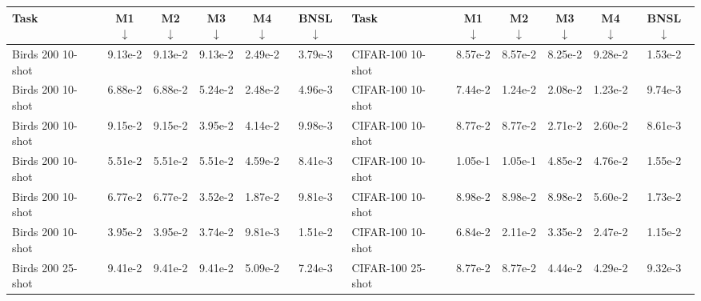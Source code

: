 \documentclass{article} %
\newcommand{\highlight}[1]{\colorbox{blue!10}{#1}}
\begin{document}
\begin{table}[htbp]
\setlength\tabcolsep{2.1pt} 
\begin{adjustwidth}{-2.2cm}{-1cm}
\fontsize{8}{10}\selectfont
\begin{tabular}
{|p{} c c c c c || p{} c c c c c |}
\hline
\hspace{.9cm}Task & M1 $\downarrow$ & M2 $\downarrow$ & M3 $\downarrow$ & M4 $\downarrow$ & BNSL $\downarrow$ & \hspace{.9cm}Task & M1 $\downarrow$ & M2 $\downarrow$ & M3 $\downarrow$ & M4 $\downarrow$ & BNSL $\downarrow$\\
\hline
Birds 200 10-shot & 9.13e-2 & 9.13e-2 & 9.13e-2 & 2.49e-2 & \highlight{3.79e-3} & CIFAR-100 10-shot & 8.57e-2 & 8.57e-2 & 8.25e-2 & 9.28e-2 & \highlight{1.53e-2} \\
Birds 200 10-shot & 6.88e-2 & 6.88e-2 & 5.24e-2 & 2.48e-2 & \highlight{4.96e-3} & CIFAR-100 10-shot & 7.44e-2 & 1.24e-2 & 2.08e-2 & 1.23e-2 & \highlight{9.74e-3} \\
Birds 200 10-shot & 9.15e-2 & 9.15e-2 & 3.95e-2 & 4.14e-2 & \highlight{9.98e-3} & CIFAR-100 10-shot & 8.77e-2 & 8.77e-2 & 2.71e-2 & 2.60e-2 & \highlight{8.61e-3} \\
Birds 200 10-shot & 5.51e-2 & 5.51e-2 & 5.51e-2 & 4.59e-2 & \highlight{8.41e-3} & CIFAR-100 10-shot & 1.05e-1 & 1.05e-1 & 4.85e-2 & 4.76e-2 & \highlight{1.55e-2} \\
Birds 200 10-shot & 6.77e-2 & 6.77e-2 & 3.52e-2 & 1.87e-2 & \highlight{9.81e-3} & CIFAR-100 10-shot & 8.98e-2 & 8.98e-2 & 8.98e-2 & 5.60e-2 & \highlight{1.73e-2} \\
Birds 200 10-shot & 3.95e-2 & 3.95e-2 & 3.74e-2 & \highlight{9.81e-3} & 1.51e-2 & CIFAR-100 10-shot & 6.84e-2 & 2.11e-2 & 3.35e-2 & 2.47e-2 & \highlight{1.15e-2} \\
Birds 200 25-shot & 9.41e-2 & 9.41e-2 & 9.41e-2 & 5.09e-2 & \highlight{7.24e-3} & CIFAR-100 25-shot & 8.77e-2 & 8.77e-2 & 4.44e-2 & 4.29e-2 & \highlight{9.32e-3} \\

\end{tabular}
\end{adjustwidth}
\end{table}
\end{document}
